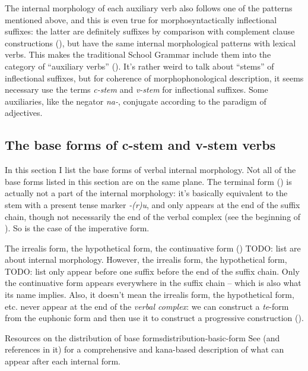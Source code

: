 \documentclass[UTF8, a4paper, oneside, scheme=plain]{ctexrep}
\newcommand*{\citesec}[1]{\S~{#1}}
\newcommand*{\term}[1]{\emph{#1}}
\newcommand{\corpus}[1]{\emph{#1}}
\begin{document}
The internal morphology of each auxiliary verb also follows one of the patterns mentioned above,
and this is even true for morphosyntactically inflectional suffixes:
the latter are definitely suffixes by comparison with complement clause constructions 
(),
but have the same internal morphological patterns with lexical verbs.
This makes the traditional School Grammar include them into the category of ``auxiliary verbs''
().
It's rather weird to talk about ``stems'' of inflectional suffixes,
but for coherence of morphophonological description,
it seems necessary use the terms \term{c-stem} and \term{v-stem} for inflectional suffixes.
Some auxiliaries, like the negator \corpus{na-},
conjugate according to the paradigm of adjectives.

\subsection{The base forms of c-stem and v-stem verbs}\label{sec:internal-forms}

In this section I list the base forms of verbal internal morphology.
Not all of the base forms listed in this section are on the same plane.
The terminal form () is actually not a part of the internal morphology:
it's basically equivalent to the stem with a present tense marker \corpus{-(r)u},
and only appears at the end of the suffix chain,
though not necessarily the end of the verbal complex
(see the beginning of ).
So is the case of the imperative form.

The irrealis form, the hypothetical form, 
the continuative form () TODO: list
are about internal morphology.
However, the irrealis form, the hypothetical form, TODO: list 
only appear before one suffix before the end of the suffix chain.
Only the continuative form appears everywhere in the suffix chain -- 
which is also what its name implies.
Also, it doesn't mean the irrealis form, the hypothetical form, etc. 
never appear at the end of the \emph{verbal complex}:
we can construct a \corpus{te}-form from the euphonic form 
and then use it to construct a progressive construction (). 

\begin{infobox}{Resources on the distribution of base forms}{distribution-basic-form}
    See \citet[\citesec{3.2.4}]{gu2004} (and references in it) 
    for a comprehensive and kana-based description of 
    what can appear after each internal form.
\end{infobox}
\end{document}
